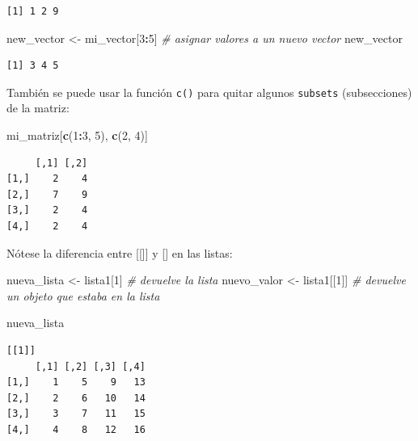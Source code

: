 \documentclass[
]{article}
\newenvironment{Shaded}{\begin{snugshade}}{\end{snugshade}}
\newcommand{\CommentTok}[1]{\textcolor[rgb]{0.56,0.35,0.01}{\textit{#1}}}
\newcommand{\DecValTok}[1]{\textcolor[rgb]{0.00,0.00,0.81}{#1}}
\newcommand{\FunctionTok}[1]{\textcolor[rgb]{0.13,0.29,0.53}{\textbf{#1}}}
\newcommand{\NormalTok}[1]{#1}
\newcommand{\OtherTok}[1]{\textcolor[rgb]{0.56,0.35,0.01}{#1}}
\newcommand{\SpecialCharTok}[1]{\textcolor[rgb]{0.81,0.36,0.00}{\textbf{#1}}}
\begin{document}
\begin{verbatim}
[1] 1 2 9
\end{verbatim}

\begin{Shaded}
\begin{Highlighting}[]
\NormalTok{new\_vector }\OtherTok{\textless{}{-}}\NormalTok{ mi\_vector[}\DecValTok{3}\SpecialCharTok{:}\DecValTok{5}\NormalTok{]  }\CommentTok{\# asignar valores a un nuevo vector}
\NormalTok{new\_vector}
\end{Highlighting}
\end{Shaded}

\begin{verbatim}
[1] 3 4 5
\end{verbatim}

También se puede usar la función \texttt{c()} para quitar algunos \texttt{subsets} (subsecciones) de la matriz:

\begin{Shaded}
\begin{Highlighting}[]
\NormalTok{mi\_matriz[}\FunctionTok{c}\NormalTok{(}\DecValTok{1}\SpecialCharTok{:}\DecValTok{3}\NormalTok{, }\DecValTok{5}\NormalTok{), }\FunctionTok{c}\NormalTok{(}\DecValTok{2}\NormalTok{, }\DecValTok{4}\NormalTok{)]}
\end{Highlighting}
\end{Shaded}

\begin{verbatim}
     [,1] [,2]
[1,]    2    4
[2,]    7    9
[3,]    2    4
[4,]    2    4
\end{verbatim}

Nótese la diferencia entre {[}{[}{]}{]} y {[}{]} en las listas:

\begin{Shaded}
\begin{Highlighting}[]
\NormalTok{nueva\_lista }\OtherTok{\textless{}{-}}\NormalTok{ lista1[}\DecValTok{1}\NormalTok{]  }\CommentTok{\# devuelve la lista}
\NormalTok{nuevo\_valor }\OtherTok{\textless{}{-}}\NormalTok{ lista1[[}\DecValTok{1}\NormalTok{]]  }\CommentTok{\# devuelve un objeto que estaba en la lista}

\NormalTok{nueva\_lista}
\end{Highlighting}
\end{Shaded}

\begin{verbatim}
[[1]]
     [,1] [,2] [,3] [,4]
[1,]    1    5    9   13
[2,]    2    6   10   14
[3,]    3    7   11   15
[4,]    4    8   12   16
\end{verbatim}
\end{document}
